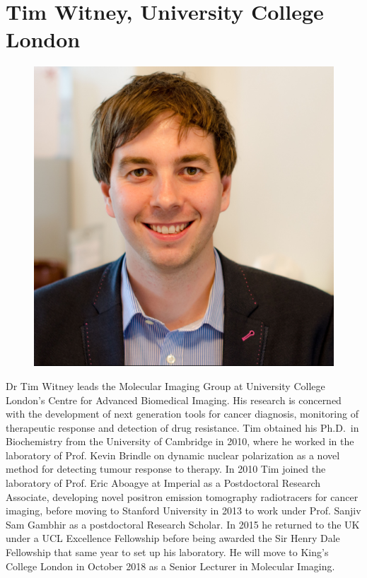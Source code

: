 \documentclass[a5paper,10pt,twoside,onecolumn,openany,helvetica,showtrims]{memoir}
\newlength{\SpeakerSize}
\begin{document}
\section*{Tim Witney, University College London}
\begin{figure}
\includegraphics[width=\SpeakerSize]{SpeakerPics/image7}	
\end{figure}
Dr Tim Witney leads the Molecular Imaging Group at University College London’s Centre for Advanced Biomedical Imaging. His research is concerned with the development of next generation tools for cancer diagnosis, monitoring of therapeutic response and detection of drug resistance. Tim obtained his Ph.D.~in Biochemistry from the University of Cambridge in 2010, where he worked in the laboratory of Prof. Kevin Brindle on dynamic nuclear polarization as a novel method for detecting tumour response to therapy. In 2010 Tim joined the laboratory of Prof. Eric Aboagye at Imperial as a Postdoctoral Research Associate, developing novel positron emission tomography radiotracers for cancer imaging, before moving to Stanford University in 2013 to work under Prof. Sanjiv Sam Gambhir as a postdoctoral Research Scholar. In 2015 he returned to the UK under a UCL Excellence Fellowship before being awarded the Sir Henry Dale Fellowship that same year to set up his laboratory. He will move to King’s College London in October 2018 as a Senior Lecturer in Molecular Imaging.
\end{document}
